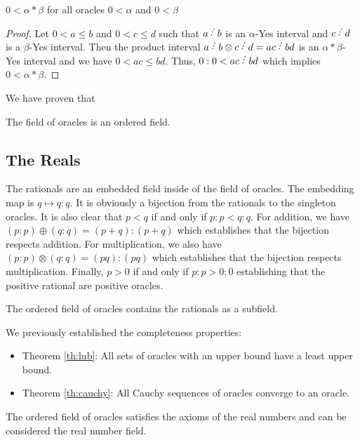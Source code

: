 \documentclass[12pt]{article}
\begin{document}
\begin{proposition}
$0 < \alpha*\beta$ for all oracles $0 < \alpha$ and $0< \beta$ 
\end{proposition}

\begin{proof}
Let $0 < a \leq b$ and $0<c \leq d$ such that $a\lte b$ is an $\alpha$-Yes interval and $c\lte d$ is a $\beta$-Yes interval. Then the product interval $a \lte b \otimes c \lte d = ac \lte bd$ is an $\alpha*\beta$-Yes interval and we have $0 < ac \leq bd$. Thus, $0:0 < ac \lte bd$ which implies $0 < \alpha*\beta$. 
\end{proof}

We have proven that

\begin{theorem}
The field of oracles is an ordered field.
\end{theorem}

\subsection{The Reals}

The rationals are an embedded field inside of the field of oracles. The embedding map is $q \mapsto q:q$. It is obviously a bijection from the rationals to the singleton oracles. It is also clear that $p<q$ if and only if $p:p < q:q$. For addition, we have $(p:p) \oplus (q:q) = (p+q):(p+q)$ which establishes that the bijection respects addition. For multiplication, we also have $(p:p) \otimes (q:q) = (pq):(pq)$ which establishes that the bijection respects multiplication.  Finally, $p>0$ if and only if $p:p > 0:0$ establishing that the positive rational are positive oracles. 

\begin{theorem}
The ordered field of oracles contains the rationals as a subfield. 
\end{theorem}

We previously established the completeness properties:

\begin{itemize}
    \item  Theorem \ref{th:lub}: All sets of oracles with an upper bound have a least upper bound. 
    \item Theorem \ref{th:cauchy}: All Cauchy sequences of oracles converge to an oracle. 
\end{itemize}

\begin{theorem}
The ordered field of oracles satisfies the axioms of the real numbers and can be considered the real number field. 
\end{theorem}
\end{document}
